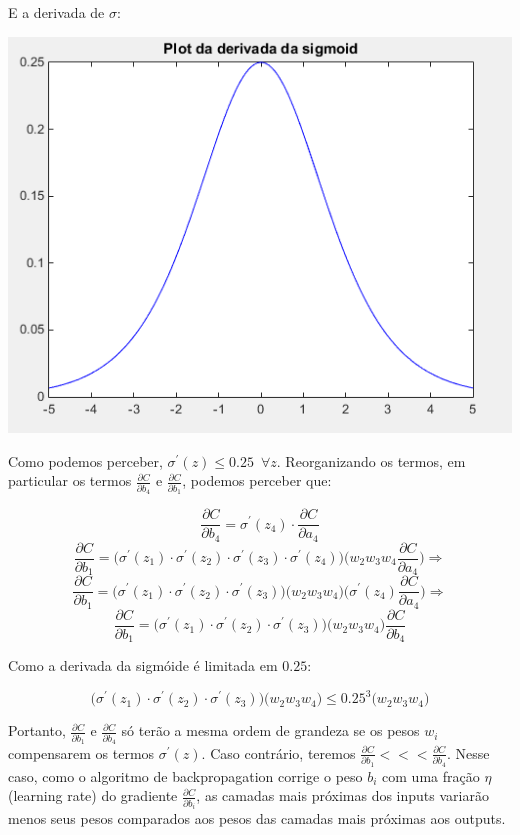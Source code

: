\documentclass[
	12pt,				%
	oneside,			%
	a4paper,			%
	english,			%
	french,				%
	spanish,			%
	brazil,				%
	]{abntex2}
\begin{document}
E a derivada de $\sigma$:

\begin{center}
	\includegraphics[scale=0.8]{plotderiv.png}
\end{center}

Como podemos perceber, $\sigma^{'}(z) \leq 0.25 \enspace \forall z$. Reorganizando os termos, em particular os termos $\frac{\partial C}{\partial b_4}$ e $\frac{\partial C}{\partial b_1}$, podemos perceber que:

$$ \frac{\partial C}{\partial b_4} =  \sigma^{'}(z_4)\cdot\frac{\partial C}{\partial a_4} $$
$$\frac{\partial C}{\partial b_1} =\bigg( \sigma^{'}(z_1) \cdot \sigma^{'}(z_2) \cdot \sigma^{'}(z_3) \cdot \sigma^{'}(z_4) \bigg)\bigg( w_2 w_3 w_4 \frac{\partial C}{\partial a_4}\bigg) \Rightarrow $$
$$ \frac{\partial C}{\partial b_1} = \bigg( \sigma^{'}(z_1) \cdot \sigma^{'}(z_2) \cdot \sigma^{'}(z_3) \bigg)\bigg( w_2 w_3 w_4\bigg) \bigg( \sigma^{'}(z_4) \frac{\partial C}{\partial a_4} \bigg) \Rightarrow $$
$$  \frac{\partial C}{\partial b_1} = \bigg( \sigma^{'}(z_1) \cdot \sigma^{'}(z_2) \cdot \sigma^{'}(z_3) \bigg)\bigg( w_2 w_3 w_4\bigg) \frac{\partial C}{\partial b_4} $$

Como a derivada da sigmóide é limitada em $0.25$:

$$\bigg( \sigma^{'}(z_1) \cdot \sigma^{'}(z_2) \cdot \sigma^{'}(z_3) \bigg)\bigg( w_2 w_3 w_4\bigg) \leq 0.25^3 \bigg( w_2 w_3 w_4\bigg) $$

Portanto, $\frac{\partial C}{\partial b_1}$ e $\frac{\partial C}{\partial b_4}$ só terão a mesma ordem de grandeza se os pesos $w_i$ compensarem os termos $\sigma^{'}(z)$. Caso contrário, teremos $\frac{\partial C}{\partial b_1} <<< \frac{\partial C}{\partial b_4}$. Nesse caso, como o algoritmo de backpropagation corrige o peso $b_i$ com uma fração $\eta$ (learning rate) do gradiente $\frac{\partial C}{\partial b_i}$, as camadas mais próximas dos inputs variarão menos seus pesos comparados aos pesos das camadas mais próximas aos outputs.
\end{document}

